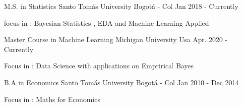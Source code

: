 

\begin{cventries}

  \cventry
    {M.S. in Statistics} %
    {Santo Tomás University} %
    {Bogotá - Col} %
    {Jan 2018 - Currently } %
    {
      \begin{cvitems} %
        \item {focus in : Bayesian Statistics , EDA and Machine Learning Applied }
      \end{cvitems}
    }

  \cventry
    {Master Course in  Machine Learning} %
    {Michigan University} %
    {Usa} %
    {Apr. 2020 - Currently } %
    {
      \begin{cvitems} %
        \item {Focus in : Data Science with applications on Emprirical Bayes}
      \end{cvitems}
    }


  \cventry
    {B.A in Economics} %
    {Santo Tomás University} %
    {Bogotá - Col} %
    {Jan 2010 - Dec 2014} %
    {
      \begin{cvitems} %
        \item {Focus in : Maths for Economics }
      \end{cvitems}
    }

\end{cventries}
